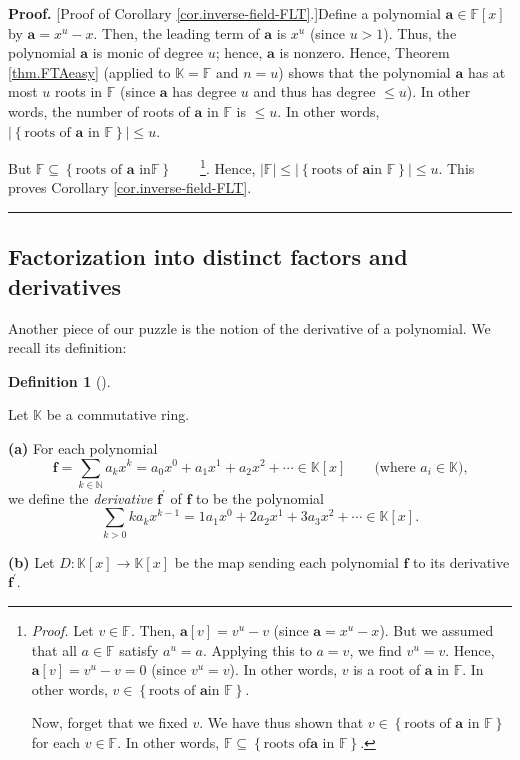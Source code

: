 \documentclass[numbers=enddot,12pt,final,onecolumn,notitlepage]{scrartcl}%
\theoremstyle{definition}
\newtheorem{defi}[theo]{Definition}
\newenvironment{definition}[1][]
{\begin{defi}[#1]\begin{leftbar}}
{\end{leftbar}\end{defi}}
\newenvironment{proof}[1][Proof]{\noindent\textbf{#1.} }{\ \rule{0.5em}{0.5em}}
\let\sumnonlimits\sum
\renewcommand{\sum}{\sumnonlimits\limits}
\begin{document}
\begin{proof}
[Proof of Corollary \ref{cor.inverse-field-FLT}.]Define a polynomial
$\mathbf{a}\in\mathbb{F}\left[  x\right]  $ by $\mathbf{a}=x^{u}-x$. Then, the
leading term of $\mathbf{a}$ is $x^{u}$ (since $u>1$). Thus, the polynomial
$\mathbf{a}$ is monic of degree $u$; hence, $\mathbf{a}$ is nonzero. Hence,
Theorem \ref{thm.FTAeasy} (applied to $\mathbb{K}=\mathbb{F}$ and $n=u$) shows
that the polynomial $\mathbf{a}$ has at most $u$ roots in $\mathbb{F}$ (since
$\mathbf{a}$ has degree $u$ and thus has degree $\leq u$). In other words, the
number of roots of $\mathbf{a}$ in $\mathbb{F}$ is $\leq u$. In other words,
$\left\vert \left\{  \text{roots of }\mathbf{a}\text{ in }\mathbb{F}\right\}
\right\vert \leq u$.

But\textit{ }$\mathbb{F}\subseteq\left\{  \text{roots of }\mathbf{a}\text{ in
}\mathbb{F}\right\}  $\ \ \ \ \footnote{\textit{Proof.} Let $v\in\mathbb{F}$.
Then, $\mathbf{a}\left[  v\right]  =v^{u}-v$ (since $\mathbf{a}=x^{u}-x$). But
we assumed that all $a\in\mathbb{F}$ satisfy $a^{u}=a$. Applying this to
$a=v$, we find $v^{u}=v$. Hence, $\mathbf{a}\left[  v\right]  =v^{u}-v=0$
(since $v^{u}=v$). In other words, $v$ is a root of $\mathbf{a}$ in
$\mathbb{F}$. In other words, $v\in\left\{  \text{roots of }\mathbf{a}\text{
in }\mathbb{F}\right\}  $.
\par
Now, forget that we fixed $v$. We have thus shown that $v\in\left\{
\text{roots of }\mathbf{a}\text{ in }\mathbb{F}\right\}  $ for each
$v\in\mathbb{F}$. In other words, $\mathbb{F}\subseteq\left\{  \text{roots of
}\mathbf{a}\text{ in }\mathbb{F}\right\}  $.}. Hence, $\left\vert
\mathbb{F}\right\vert \leq\left\vert \left\{  \text{roots of }\mathbf{a}\text{
in }\mathbb{F}\right\}  \right\vert \leq u$. This proves Corollary
\ref{cor.inverse-field-FLT}.
\end{proof}

\subsection{Factorization into distinct factors and derivatives}

Another piece of our puzzle is the notion of the derivative of a polynomial.
We recall its definition:

\begin{definition}
\label{def.f'}Let $\mathbb{K}$ be a commutative ring.

\textbf{(a)} For each polynomial
\[
\mathbf{f}=\sum_{k\in\mathbb{N}}a_{k}x^{k}=a_{0}x^{0}+a_{1}x^{1}+a_{2}%
x^{2}+\cdots\in\mathbb{K}\left[  x\right]  \qquad\text{(where $a_{i}%
\in\mathbb{K}$),}%
\]
we define the \textit{derivative} $\mathbf{f}^{\prime}$ of $\mathbf{f}$ to be
the polynomial
\[
\sum_{k>0}ka_{k}x^{k-1}=1a_{1}x^{0}+2a_{2}x^{1}+3a_{3}x^{2}+\cdots
\in\mathbb{K}\left[  x\right]  .
\]


\textbf{(b)} Let $D:\mathbb{K}\left[  x\right]  \rightarrow\mathbb{K}\left[
x\right]  $ be the map sending each polynomial $\mathbf{f}$ to its derivative
$\mathbf{f}^{\prime}$.
\end{definition}
\end{document}
